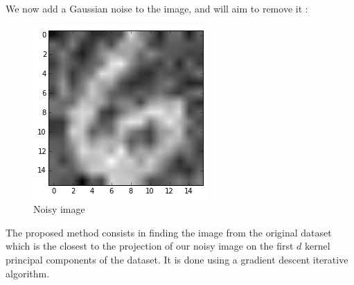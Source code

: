 \documentclass[11pt,a4paper]{article}
\begin{document}
We now add a Gaussian noise to the image, and will aim to remove it :
\begin{figure}[H]
	\centering
	\noindent\includegraphics[scale=0.7]{noisy.png}
	\caption{Noisy image}
\end{figure}

The proposed method consists in finding the image from the original dataset which is the closest to the projection of our noisy image on the first $d$ kernel principal components of the dataset. It is done using a gradient descent iterative algorithm.
\end{document}
